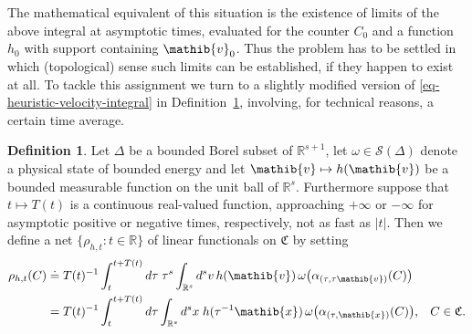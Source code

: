 \documentclass[11pt,twoside,openright]{report}
\theoremstyle{definition}
\newtheorem{Def}{Definition}[chapter]
\theoremstyle{plain}
\theoremstyle{remark}
\theoremstyle{assumption}
\newcommand{\bset}[1]{\bigl\{ #1 \bigr\}}
\newcommand{\abs}[1]{\lvert #1 \rvert}
\newcommand{\Rbb}{\mathbb{R}}
\newcommand{\Cfrak}{\mathfrak{C}}
\newcommand{\vib}{\mathib{v}}
\newcommand{\xib}{\mathib{x}}
\newcommand{\Sscr}{\mathscr{S}}
\newcommand{\Rs}{\mathbb{R}^s}
\newcommand{\Rsone}{\mathbb{R}^{s + 1}}
\begin{document}
The mathematical equivalent of this situation is the existence of
limits of the above integral at asymptotic times, evaluated for the
counter $C_0$ and a function $h_0$ with support containing
$\vib_0$. Thus the problem has to be settled in which (topological)
sense such limits can be established, if they happen to exist at
all. To tackle this assignment we turn to a slightly modified version
of \eqref{eq-heuristic-velocity-integral} in
Definition~\ref{Def-rho-definition}, involving, for technical reasons,
a certain time average.
\begin{Def}
  \label{Def-rho-definition}
  Let $\Delta$ be a bounded Borel subset of $\Rsone$, let $\omega \in
  \Sscr ( \Delta )$ denote a physical state of bounded energy and let
  $\vib \mapsto h ( \vib )$ be a bounded measurable function on the
  unit ball of $\Rs$. Furthermore suppose that $t \mapsto T ( t )$ is
  a continuous real-valued function, approaching $+ \infty$ or $-
  \infty$ for asymptotic positive or negative times, respectively, not
  as fast as $\abs{t}$. Then we define a net $\bset{ \rho_{h , t} : t
  \in \Rbb}$ of linear functionals on $\Cfrak$ by setting
  \begin{equation}
    \label{eq-finite-times-functionals}
    \begin{split}
      \rho_{h , t} ( C ) & \doteq T ( t )^{-1} \int_t^{t + T ( t )} d
      \tau \; \tau^s \int_{\Rs} d^s v \, h ( \vib ) \, \omega \bigl(
      \alpha_{( \tau , \tau \vib )} ( C ) \bigr) \\
      & = T ( t )^{-1} \int_t^{t + T ( t )} d \tau \int_{\Rs} d^s x \;
      h ( \tau^{-1} \xib ) \, \omega \bigl( \alpha_{( \tau ,
      \xib )} ( C ) \bigr) \text{,} \quad C \in \Cfrak \text{.}
    \end{split}
  \end{equation}
\end{Def}
\end{document}
